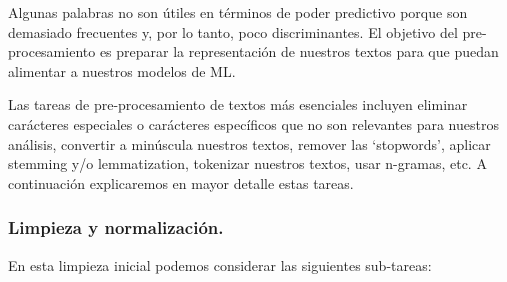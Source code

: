 \documentclass[12pt,a4paper]{article}
\begin{document}
\begin{sloppypar}
Algunas palabras no son útiles en términos de poder predictivo porque son demasiado frecuentes y, por lo tanto, poco discriminantes. El objetivo del pre-procesamiento es preparar la representación de nuestros textos para que puedan alimentar a nuestros modelos de ML.

Las tareas de pre-procesamiento de textos más esenciales incluyen eliminar carácteres especiales o carácteres específicos que no son relevantes para nuestros análisis, convertir a minúscula nuestros textos, remover las ‘stopwords’, aplicar stemming y/o lemmatization, tokenizar nuestros textos, usar n-gramas, etc. A continuación explicaremos en mayor detalle estas tareas\cite{NLP_2}.

\cleardoublepage

\subsubsection{Limpieza y normalización.}\label{Limpieza_y_norm}

En esta limpieza inicial podemos considerar las siguientes sub-tareas:
\begin{enumerate}


\end{enumerate}
\end{sloppypar}
\end{document}
